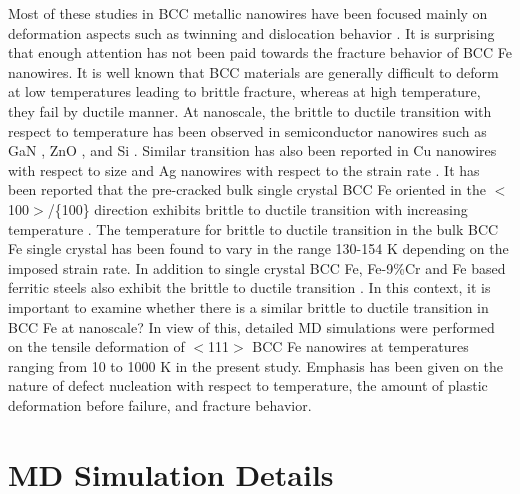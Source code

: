 \documentclass[%
reprint,%
 amssymb, amsmath,%
 aip,apl,%
]{revtex4-1}
\begin{document}
Most of these studies in BCC metallic nanowires have been focused mainly on deformation aspects such as twinning and dislocation 
behavior \cite{Sai-CMS16,Healy15,Thaulow,Wang-Nature,Oxidation,Alloy-NWs,Sai-CMS15,Reorientation,Cao,Li-PRB,Interface,Sai-MSEA15,
ADutta}. It is surprising that enough attention has not been paid towards the fracture behavior of BCC Fe nanowires. It is well 
known that BCC materials are generally difficult to deform at low temperatures leading to brittle fracture, whereas at high temperature, 
they fail by ductile manner. At nanoscale, the brittle to ductile transition with respect to temperature has been observed in 
semiconductor nanowires such as GaN \cite{GaN}, ZnO \cite{ZnO}, and Si \cite{Pizzagalli-MSMSE}. Similar transition has also 
been reported in Cu nanowires with respect to size \cite{Cu-DBTT} and Ag nanowires with respect to the strain rate \cite{Ag-DBTT}. 
It has been reported that the pre-cracked bulk single crystal BCC Fe oriented in the $<$100$>$/\{100\} direction exhibits brittle 
to ductile transition with increasing temperature \cite{BCC-Fe-DBT}. The temperature for brittle to ductile transition in the bulk
BCC Fe single crystal has been found to vary in the range 130-154 K depending on the imposed strain rate. In addition to single crystal 
BCC Fe, Fe-9\%Cr and Fe based ferritic steels also exhibit the brittle to ductile transition \cite{BCC-Fe-DBT-2}. In this context, 
it is important to examine whether there is a similar brittle to ductile transition in BCC Fe at nanoscale? In view of this, detailed 
MD simulations were performed on the tensile deformation of $<$111$>$ BCC Fe nanowires at temperatures ranging from 10 to 1000 K in 
the present study. Emphasis has been given on the nature of defect nucleation with respect to temperature, the amount of plastic 
deformation before failure, and fracture behavior.

\section{MD Simulation Details}
\end{document}
